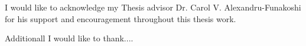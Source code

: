 
\begin{acknowledgements}
I would like to acknowledge my Thesis advisor Dr. Carol V. Alexandru-Funakoshi
for his support and encouragement throughout this thesis work.

Additionall I would like to thank....

\end{acknowledgements}
